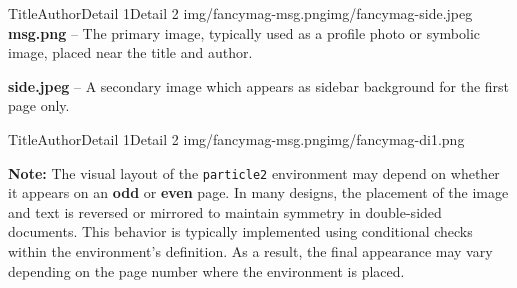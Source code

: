 \documentclass[10pt,twoside]{article}
\begin{document}
{\begin{particle2}{Title}{Author}{Detail 1}{Detail 2} {img/fancymag-msg.png}{img/fancymag-side.jpeg}
        \bullet \textbf{msg.png} – The primary image, typically used as a profile photo or symbolic image, placed near the title and author.
        
        \bullet \textbf{side.jpeg} – A secondary image which appears as sidebar  background for the first page only.
        
    \end{particle2}
    
    \begin{particle2}{Title}{Author}{Detail 1}{Detail 2} {img/fancymag-msg.png}{img/fancymag-di1.png}
    	
		\textbf{Note:} The visual layout of the \texttt{particle2} environment may depend on whether it appears on an \textbf{odd} or \textbf{even} page. In many designs, the placement of the image and text is reversed or mirrored to maintain symmetry in double-sided documents. This behavior is typically implemented using conditional checks within the environment's definition. As a result, the final appearance may vary depending on the page number where the environment is placed.
    	
    \end{particle2}

         

  	\fancyhf{}
  	\fancyhead[RO]{\textcolor{accent}{\large\textbf{\thepage}}}
  	\fancyhead[LE]{\textcolor{accent}{\large\textbf{\thepage}}}
  	
  	
  	
  	
  	
}
\end{document}
